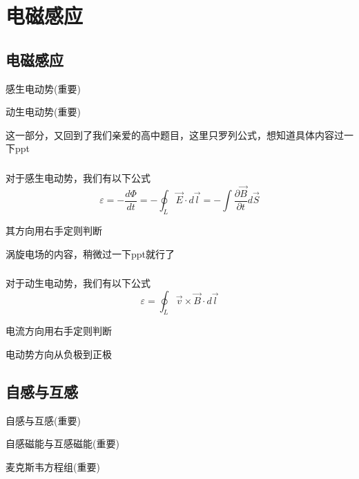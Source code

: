 \documentclass[lang=cn,10pt]{elegantbook}
\begin{document}
	\chapter{电磁感应}
	\section{电磁感应}
	
	\begin{introduction}
		\item 感生电动势(重要)
		\item 动生电动势(重要)
	\end{introduction}
	这一部分，又回到了我们亲爱的高中题目，这里只罗列公式，想知道具体内容过一下ppt
	\subsection{\color{red}}
	对于感生电动势，我们有以下公式
	\begin{equation*}
		\varepsilon =-\frac{d\varPhi}{dt}=-\oint_L{\overrightarrow{E}\cdot d\overrightarrow{l}}=-\int{\frac{\partial \overrightarrow{B}}{\partial t}d\overrightarrow{S}}
	\end{equation*}
	\begin{remark}
		其方向用右手定则判断
	\end{remark}
	\begin{remark}
		涡旋电场的内容，稍微过一下ppt就行了
	\end{remark}
	\subsection{\color{red}}
	对于动生电动势，我们有以下公式
	\begin{equation*}
		\varepsilon =\oint_L{\overrightarrow{v}\times \overrightarrow{B}\cdot d\overrightarrow{l}}
	\end{equation*}
	\begin{remark}
		电流方向用右手定则判断
	\end{remark}
	\begin{remark}
		电动势方向从负极到正极
	\end{remark}
	\section{自感与互感}
	\begin{introduction}
		\item 自感与互感(重要)
		\item 自感磁能与互感磁能(重要)
		\item 麦克斯韦方程组(重要)
	\end{introduction}
\end{document}
